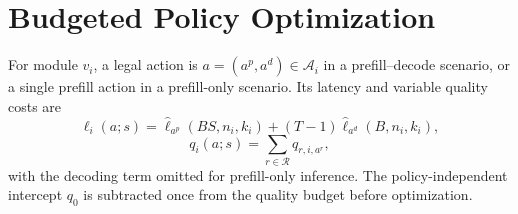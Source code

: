 \documentclass[letterpaper]{article} %
\numberwithin{equation}{section}
\numberwithin{table}{section}
\begin{document}

\section{Budgeted Policy Optimization}
\label{app:optimization}

For module \(v_i\), a legal action is \(a=(a^p,a^d)\in\mathcal{A}_i\) in a
prefill--decode scenario, or a single prefill action in a prefill-only
scenario. Its latency and variable quality costs are
\begin{equation}
\ell_i(a;s)
=
\widehat{\ell}_{a^p}(BS,n_i,k_i)
+(T-1)\widehat{\ell}_{a^d}(B,n_i,k_i),
\end{equation}
\begin{equation}
q_i(a;s)
=
\sum_{r\in\mathcal{R}}q_{r,i,a^r},
\end{equation}
with the decoding term omitted for prefill-only inference. The
policy-independent intercept \(q_0\) is subtracted once from the quality
budget before optimization.
\end{document}
